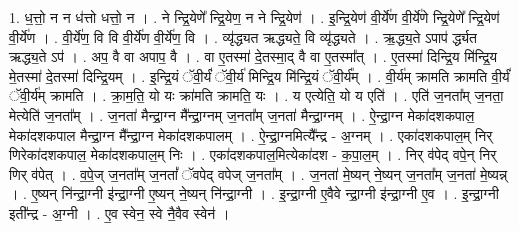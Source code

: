\documentclass[17pt]{extarticle}
\begin{document}
1. ध॒त्तो॒ न न ध॑त्तो धत्तो॒ न । . ने न्द्रि॒येणे᳚ न्द्रि॒येण॒ न ने न्द्रि॒येण॑ । . इ॒न्द्रि॒येण॑ वी॒र्ये॑ण वी॒र्ये॑णे न्द्रि॒येणे᳚ न्द्रि॒येण॑ वी॒र्ये॑ण । . वी॒र्ये॑ण॒ वि वि वी॒र्ये॑ण वी॒र्ये॑ण॒ वि । . व्यृ॑द्ध्यत ऋद्ध्यते॒ वि व्यृ॑द्ध्यते । . ऋ॒द्ध्य॒ते ऽपाप॑ र्द्ध्यत ऋद्ध्य॒ते ऽप॑ । . अप॒ वै वा अपाप॒ वै । . वा ए॒तस्मा॑ दे॒तस्मा॒द् वै वा ए॒तस्मा᳚त् । . ए॒तस्मा॑ दिन्द्रि॒य मि॑न्द्रि॒य मे॒तस्मा॑ दे॒तस्मा॑ दिन्द्रि॒यम् । . इ॒न्द्रि॒यं ॅवी॒र्यं॑ ॅवी॒र्य॑ मिन्द्रि॒य मि॑न्द्रि॒यं ॅवी॒र्य᳚म् । . वी॒र्य॑म् क्रामति क्रामति वी॒र्यं॑ ॅवी॒र्य॑म् क्रामति । . क्रा॒म॒ति॒ यो यः क्रा॑मति क्रामति॒ यः । . य एत्येति॒ यो य एति॑ । . एति॑ ज॒नता᳚म् ज॒नता॒ मेत्येति॑ ज॒नता᳚म् । . ज॒नता॑ मैन्द्रा॒ग्न मै᳚न्द्रा॒ग्नम् ज॒नता᳚म् ज॒नता॑ मैन्द्रा॒ग्नम् । . ऐ॒न्द्रा॒ग्न मेका॑दशकपाल॒ मेका॑दशकपाल मैन्द्रा॒ग्न मै᳚न्द्रा॒ग्न मेका॑दशकपालम् । . ऐ॒न्द्रा॒ग्नमित्यै᳚न्द्र - अ॒ग्नम् । . एका॑दशकपाल॒म् निर् णिरेका॑दशकपाल॒ मेका॑दशकपाल॒म् निः । . एका॑दशकपाल॒मित्येका॑दश - क॒पा॒ल॒म् । . निर् व॑पेद् वपे॒न् निर् णिर् व॑पेत् । . व॒पे॒ज् ज॒नता᳚म् ज॒नतां᳚ ॅवपेद् वपेज् ज॒नता᳚म् । . ज॒नता॑ मे॒ष्यन् ने॒ष्यन् ज॒नता᳚म् ज॒नता॑ मे॒ष्यन्न् । . ए॒ष्यन् नि॑न्द्रा॒ग्नी इ॑न्द्रा॒ग्नी ए॒ष्यन् ने॒ष्यन् नि॑न्द्रा॒ग्नी । . इ॒न्द्रा॒ग्नी ए॒वैवे न्द्रा॒ग्नी इ॑न्द्रा॒ग्नी ए॒व । . इ॒न्द्रा॒ग्नी इती᳚न्द्र - अ॒ग्नी । . ए॒व स्वेन॒ स्वे नै॒वैव स्वेन॑ । \newline
\end{document}
